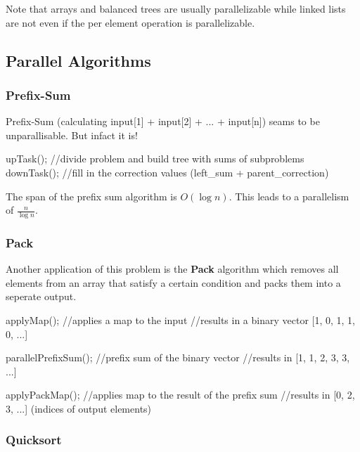 \begin{remark}
    Note that arrays and balanced trees are usually parallelizable while linked lists are not even if the per element operation is parallelizable.
\end{remark}

\subsection{Parallel Algorithms}

\subsubsection{Prefix-Sum}

\begin{remark}
    Prefix-Sum (calculating input[1] + input[2] + ... + input[n]) seams to be unparallisable. But infact it is!
\end{remark}

\begin{algorithm}
upTask(); //divide problem and build tree with sums of subproblems
downTask(); //fill in the correction values (left_sum + parent_correction)
\end{algorithm}

\begin{theorem}
    The span of the prefix sum algorithm is $O(\log n)$. This leads to a parallelism of $\frac{n}{\log n}$.
\end{theorem}

\subsubsection{Pack}

Another application of this problem is the \textbf{Pack} algorithm which removes all elements from an array that satisfy a certain condition and packs them into a seperate output.

\begin{algorithm}
applyMap(); //applies a map to the input
//results in a binary vector [1, 0, 1, 1, 0, ...]

parallelPrefixSum(); //prefix sum of the binary vector
//results in [1, 1, 2, 3, 3, ...]

applyPackMap(); //applies map to the result of the prefix sum
//results in [0, 2, 3, ...] (indices of output elements)
\end{algorithm}

\subsubsection{Quicksort}

